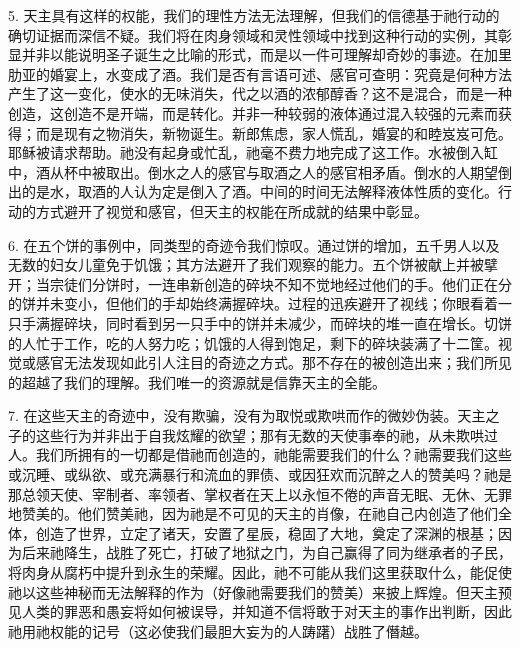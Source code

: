 5. 天主具有这样的权能，我们的理性方法无法理解，但我们的信德基于祂行动的确切证据而深信不疑。我们将在肉身领域和灵性领域中找到这种行动的实例，其彰显并非以能说明圣子诞生之比喻的形式，而是以一件可理解却奇妙的事迹。在加里肋亚的婚宴上，水变成了酒。我们是否有言语可述、感官可查明：究竟是何种方法产生了这一变化，使水的无味消失，代之以酒的浓郁醇香？这不是混合，而是一种创造，这创造不是开端，而是转化。并非一种较弱的液体通过混入较强的元素而获得；而是现有之物消失，新物诞生。新郎焦虑，家人慌乱，婚宴的和睦岌岌可危。耶稣被请求帮助。祂没有起身或忙乱，祂毫不费力地完成了这工作。水被倒入缸中，酒从杯中被取出。倒水之人的感官与取酒之人的感官相矛盾。倒水的人期望倒出的是水，取酒的人认为定是倒入了酒。中间的时间无法解释液体性质的变化。行动的方式避开了视觉和感官，但天主的权能在所成就的结果中彰显。\par

6. 在五个饼的事例中，同类型的奇迹令我们惊叹。通过饼的增加，五千男人以及无数的妇女儿童免于饥饿；其方法避开了我们观察的能力。五个饼被献上并被擘开；当宗徒们分饼时，一连串新创造的碎块不知不觉地经过他们的手。他们正在分的饼并未变小，但他们的手却始终满握碎块。过程的迅疾避开了视线；你眼看着一只手满握碎块，同时看到另一只手中的饼并未减少，而碎块的堆一直在增长。切饼的人忙于工作，吃的人努力吃；饥饿的人得到饱足，剩下的碎块装满了十二筐。视觉或感官无法发现如此引人注目的奇迹之方式。那不存在的被创造出来；我们所见的超越了我们的理解。我们唯一的资源就是信靠天主的全能。\par

7. 在这些天主的奇迹中，没有欺骗，没有为取悦或欺哄而作的微妙伪装。天主之子的这些行为并非出于自我炫耀的欲望；那有无数的天使事奉的祂，从未欺哄过人。我们所拥有的一切都是借祂而创造的，祂能需要我们的什么？祂需要我们这些或沉睡、或纵欲、或充满暴行和流血的罪债、或因狂欢而沉醉之人的赞美吗？祂是那总领天使、宰制者、率领者、掌权者在天上以永恒不倦的声音无眠、无休、无罪地赞美的。他们赞美祂，因为祂是不可见的天主的肖像，在祂自己内创造了他们全体，创造了世界，立定了诸天，安置了星辰，稳固了大地，奠定了深渊的根基；因为后来祂降生，战胜了死亡，打破了地狱之门，为自己赢得了同为继承者的子民，将肉身从腐朽中提升到永生的荣耀。因此，祂不可能从我们这里获取什么，能促使祂以这些神秘而无法解释的作为（好像祂需要我们的赞美）来披上辉煌。但天主预见人类的罪恶和愚妄将如何被误导，并知道不信将敢于对天主的事作出判断，因此祂用祂权能的记号（这必使我们最胆大妄为的人踌躇）战胜了僭越。\par

